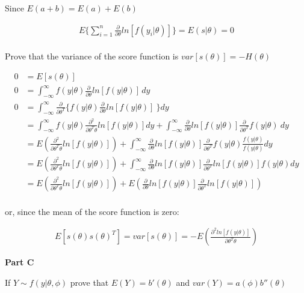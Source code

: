 \documentclass[12pt]{amsart}
\begin{document}
Since $ E(a+b) = E(a) + E(b)$

\begin{align*}
   E\{ \sum_{i=1}^{n} \frac{\partial}{\partial \theta} ln [f(y_i|\theta)] \}  = E(s|\theta)=0
\end{align*}\\

Prove that the variance of the score function is $var[s(\theta)]=-H(\theta)$

\begin{align*}
   0 &=  E[s(\theta)]\\
   0 &= \int_{-\infty}^{\infty} f(y|\theta)\frac{\partial}{\partial \theta}ln[f(y|\theta)] \,dy\\
   0 &= \int_{-\infty}^{\infty} \frac{\partial}{\partial \theta^T} \{ f(y|\theta)\frac{\partial}{\partial \theta}ln[f(y|\theta)] \ \}dy\\
   &=  \int_{-\infty}^{\infty}f(y|\theta) \frac{\partial^2}{\partial \theta^T\theta}  ln[f(y|\theta)]dy +  \int_{-\infty}^{\infty}\frac{\partial}{\partial \theta}ln[f(y|\theta)] \frac{\partial}{\partial \theta^T}  f(y|\theta)   \ dy\\
   &= E(\frac{\partial^2}{\partial \theta^T\theta}  ln[f(y|\theta)]) + \int_{-\infty}^{\infty}\frac{\partial}{\partial \theta}ln[f(y|\theta)] \frac{\partial}{\partial \theta^T}  f(y|\theta) \frac{f(y|\theta)}{f(y|\theta)} dy\\
   &= E(\frac{\partial^2}{\partial \theta^T\theta}  ln[f(y|\theta)]) + \int_{-\infty}^{\infty}\frac{\partial}{\partial \theta}ln[f(y|\theta)] \frac{\partial}{\partial \theta^T}  ln[f(y|\theta)]  f(y|\theta)dy\\
   &=E(\frac{\partial^2}{\partial \theta^T\theta}  ln[f(y|\theta)]) + E(\frac{\partial}{\partial \theta}ln[f(y|\theta)] \frac{\partial}{\partial \theta^T}  ln[f(y|\theta)])
\end{align*}\\

or, since the mean of the score function is zero:


\begin{align*}
    E[s(\theta)s(\theta)^T]= var[s(\theta)] =-E\left(\frac{\partial^2 ln[f(y|\theta)]}{\partial \theta^T\theta} \right ) 
\end{align*}


\bigskip
{\bf Part C} \\
\bigskip

If $Y \sim f(y|\theta, \phi)$ prove that $E(Y)=b'(\theta)$ and $var(Y)=a(\phi)b''(\theta)$
\end{document}
